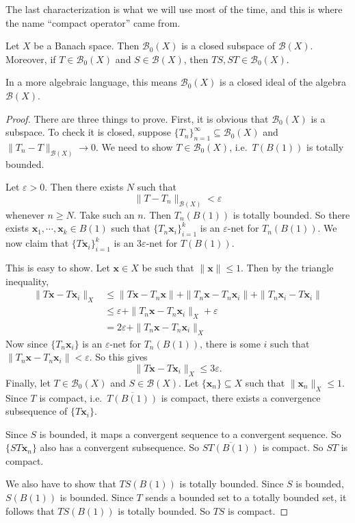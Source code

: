 \documentclass[a4paper]{article}
\begin{document}
The last characterization is what we will use most of the time, and this is where the name ``compact operator'' came from.

\begin{prop}
  Let $X$ be a Banach space. Then $\mathcal{B}_0(X)$ is a closed subspace of $\mathcal{B}(X)$. Moreover, if $T \in \mathcal{B}_0(X)$ and $S \in \mathcal{B}(X)$, then $TS, ST \in \mathcal{B}_0(X)$.

  In a more algebraic language, this means $\mathcal{B}_0(X)$ is a closed ideal of the algebra $\mathcal{B}(X)$.
\end{prop}

\begin{proof}
  There are three things to prove. First, it is obvious that $\mathcal{B}_0(X)$ is a subspace. To check it is closed, suppose $\{T_n\}_{n = 1}^\infty \subseteq \mathcal{B}_0(X)$ and $\|T_n - T\|_{\mathcal{B}(X)} \to 0$. We need to show $T \in \mathcal{B}_0(X)$, i.e.\ $T(B(1))$ is totally bounded.

  Let $\varepsilon > 0$. Then there exists $N$ such that
  \[
    \|T - T_n\|_{\mathcal{B}(X)} < \varepsilon
  \]
  whenever $n \geq N$. Take such an $n$. Then $T_n(B(1))$ is totally bounded. So there exists $\mathbf{x}_1, \cdots, \mathbf{x}_k \in B(1)$ such that $\{T_n \mathbf{x}_i\}_{i = 1}^k$ is an $\varepsilon$-net for $T_n(B(1))$. We now claim that $\{T \mathbf{x}_i\}_{i = 1}^k$ is an $3\varepsilon$-net for $T(B(1))$.

  This is easy to show. Let $\mathbf{x} \in X$ be such that $\|\mathbf{x}\| \leq 1$. Then by the triangle inequality,
  \begin{align*}
    \|T \mathbf{x} - T \mathbf{x}_i\|_X &\leq \| T \mathbf{x} - T_n \mathbf{x}\| + \|T_n \mathbf{x} - T_n \mathbf{x}_i\| + \|T_n \mathbf{x}_i - T \mathbf{x}_i\|\\
    &\leq \varepsilon + \|T_n \mathbf{x} - T_n \mathbf{x}_i\|_X + \varepsilon\\
    &= 2 \varepsilon + \|T_n \mathbf{x} - T_n \mathbf{x}_i\|_X
  \end{align*}
  Now since $\{T_n \mathbf{x}_i\}$ is an $\varepsilon$-net for $T_n (B(1))$, there is some $i$ such that $\|T_n \mathbf{x} - T_n \mathbf{x}_i\| < \varepsilon$. So this gives
  \[
    \|T \mathbf{x} - T \mathbf{x}_i\|_X \leq 3 \varepsilon.
  \]
  Finally, let $T \in \mathcal{B}_0(X)$ and $S \in \mathcal{B}(X)$. Let $\{\mathbf{x}_n \} \subseteq X$ such that $\|\mathbf{x}_n\|_X \leq 1$. Since $T$ is compact, i.e.\ $\overline{T(B(1))}$ is compact, there exists a convergence subsequence of $\{T \mathbf{x}_i\}$.

  Since $S$ is bounded, it maps a convergent sequence to a convergent sequence. So $\{S T \mathbf{x}_n\}$ also has a convergent subsequence. So $\overline{ST(B(1))}$ is compact. So $ST$ is compact.

  We also have to show that $TS(B(1))$ is totally bounded. Since $S$ is bounded, $S(B(1))$ is bounded. Since $T$ sends a bounded set to a totally bounded set, it follows that $TS(B(1))$ is totally bounded. So $TS$ is compact.
\end{proof}
\end{document}
